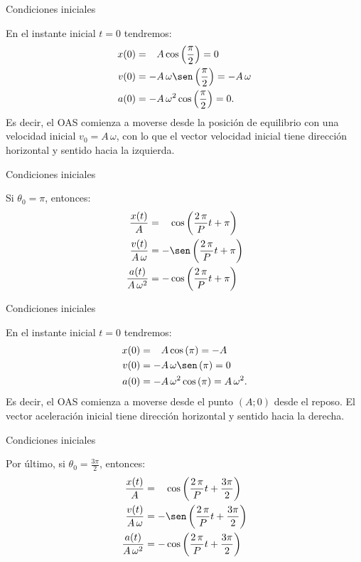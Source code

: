 \documentclass[11pt,handout,aspectratio=1610]{beamer}
\begin{document}
\begin{frame}{Condiciones iniciales}

    En el instante inicial $t = 0$ tendremos:
    \begin{align*}
        x (0) &= \phantom{+} A \cos \left(\frac{\pi}{2}\right) = 0 \\
        v (0) &= - A \, \omega \sen \left(\frac{\pi}{2}\right) = - A \, \omega \\
        a (0) &= - A \, \omega^2 \cos \left(\frac{\pi}{2}\right) = 0. 
    \end{align*} Es decir, el OAS comienza a moverse desde la posición de equilibrio con una velocidad inicial $v_0 = A \, \omega$, con lo que el vector velocidad inicial tiene dirección horizontal y sentido hacia la izquierda.

\end{frame}

\begin{frame}{Condiciones iniciales}

    Si $\theta_0 = \pi$, entonces:
    \begin{align*}
        \frac{x (t)}{A} &= \phantom{+} \cos \left(\frac{2 \, \pi}{P} t + \pi\right) \\
        \frac{v (t)}{A \, \omega} &= - \sen \left(\frac{2 \, \pi}{P} t + \pi\right) \\
        \frac{a (t)}{A \, \omega^2} &= - \cos \left(\frac{2 \, \pi}{P} t + \pi\right)
    \end{align*}

\end{frame}

\begin{frame}{Condiciones iniciales}

    En el instante inicial $t = 0$ tendremos:
    \begin{align*}
        x (0) &= \phantom{+} A \cos \left(\pi\right) = - A \\
        v (0) &= - A \, \omega \sen \left(\pi\right) = 0 \\
        a (0) &= - A \, \omega^2 \cos \left(\pi\right) = A \, \omega^2. 
    \end{align*} Es decir, el OAS comienza a moverse desde el punto $(A; 0)$ desde el reposo. El vector aceleración inicial tiene dirección horizontal y sentido hacia la derecha.

\end{frame}

\begin{frame}{Condiciones iniciales}

    Por último, si $\theta_0 = \frac{3 \pi}{2}$, entonces:
    \begin{align*}
        \frac{x (t)}{A} &= \phantom{+} \cos \left(\frac{2 \, \pi}{P} t + \frac{3 \pi}{2}\right) \\
        \frac{v (t)}{A \, \omega} &= - \sen \left(\frac{2 \, \pi}{P} t + \frac{3 \pi}{2}\right) \\
        \frac{a (t)}{A \, \omega^2} &= - \cos \left(\frac{2 \, \pi}{P} t + \frac{3 \pi}{2}\right)
    \end{align*}

\end{frame}
\end{document}
